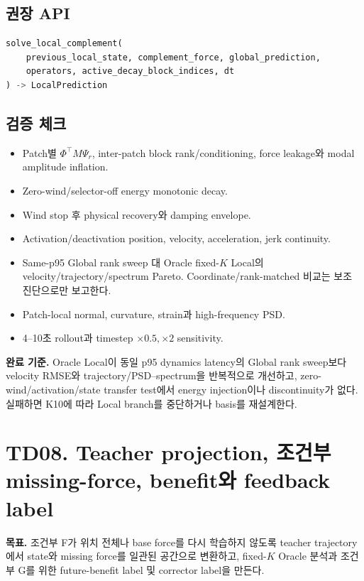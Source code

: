 \documentclass[10pt,a4paper]{article}
\newcommand{\todo}{\textcolor{TodoGray}{\(\square\)}}
\begin{document}
\subsection*{권장 API}

\begin{lstlisting}[language=Python]
solve_local_complement(
    previous_local_state, complement_force, global_prediction,
    operators, active_decay_block_indices, dt
) -> LocalPrediction
\end{lstlisting}

\subsection*{검증 체크}

\begin{itemize}
  \item[\todo] Patch별 \(\Phi^\top M\Psi_r\), inter-patch block rank/conditioning, force leakage와 modal amplitude inflation.
  \item[\todo] Zero-wind/selector-off energy monotonic decay.
  \item[\todo] Wind stop 후 physical recovery와 damping envelope.
  \item[\todo] Activation/deactivation position, velocity, acceleration, jerk continuity.
  \item[\todo] Same-p95 Global rank sweep 대 Oracle fixed-\(K\) Local의 velocity/trajectory/spectrum Pareto.
  Coordinate/rank-matched 비교는 보조 진단으로만 보고한다.
  \item[\todo] Patch-local normal, curvature, strain과 high-frequency PSD.
  \item[\todo] 4--10초 rollout과 timestep \(\times0.5,\times2\) sensitivity.
\end{itemize}

\textbf{완료 기준.}
Oracle Local이 동일 p95 dynamics latency의 Global rank sweep보다
velocity RMSE와 trajectory/PSD--spectrum을 반복적으로 개선하고,
zero-wind/activation/state transfer test에서 energy injection이나 discontinuity가 없다.
실패하면 K10에 따라 Local branch를 중단하거나 basis를 재설계한다.

\section{TD08. Teacher projection, 조건부 missing-force, benefit와 feedback label}

\textbf{목표.}
조건부 F가 위치 전체나 base force를 다시 학습하지 않도록 teacher trajectory에서 state와 missing force를 일관된 공간으로 변환하고,
fixed-\(K\) Oracle 분석과 조건부 G를 위한 future-benefit label 및 corrector label을 만든다.
\end{document}
